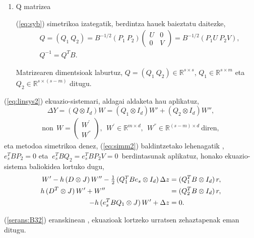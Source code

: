 \begin{enumerate}
\item Q matrizea

(\ref{eq:syb}) simetrikoa izategatik, berdintza hauek baieztatu daitezke,
\begin{align}
&Q=(Q_1 \ Q_2)=
B^{-1/2}(P_1 \ P_2)
\left(
\begin{matrix}
U & 0 \\
0 & V
\end{matrix}
\right)=
B^{-1/2} (P_1U \ P_2V), \\
&Q^{-1}=Q^TB.
\end{align}  

Matrizearen dimentsioak laburtuz, $Q=(Q_1 \ Q_2) \in \mathbb{R}^{s \times s}$, $Q_1 \in \mathbb{R}^{s \times m}$ eta $Q_2 \in \mathbb{R}^{s \times (s-m)}$ ditugu.

\end{enumerate}

(\ref{eq:linsys2}) ekuazio-sistemari, aldagai aldaketa hau aplikatuz,
\begin{equation}
\label{eq:DeltaYChVar}
 \Delta Y = (Q \otimes I_d) W= (Q_1 \otimes I_d) W'+ (Q_2 \otimes I_d) W'',
\end{equation}
\begin{align*}
\text{non}  \ \ W=\left(
\begin{matrix}
W^{'} \\
W^{''} 
\end{matrix}
\right),\ \ W^{'} \in \mathbb{R}^{m \times d}, \ \ W^{''} \in \mathbb{R}^{(s-m) \times d} \ \text{diren},
\end{align*}
%
eta metodoa simetrikoa denez, (\ref{eq:simm2}) baldintzetako lehenagatik , $e_s^TBP_2=0$ eta $\ e_s^TBQ_2=e_s^TBP_2V=0$~berdintasunak aplikatuz, honako ekuazio-sistema baliokidea lortuko dugu,
\begin{equation}
\label{eq:linsys4}
  \begin{split}
       W' -h \, (D \otimes J)\,  W'' - \half\, (Q_1^T B e_s \otimes I_\dim) \, \Delta z &= (Q_1^T B \otimes I_\dim )\, r, \\
    h \, (D^T \otimes J)\, W'  + W'' \phantom{+\half\, (Q_2^T B e_s \otimes I_\dim) \, \Delta z  }
    &= (Q_2^T B \otimes I_\dim )\, r,\\
-h \, (e_s^T  B  Q_1 \otimes J) \, W' + \Delta z &= 0.
  \end{split}
\end{equation}

(\ref{serans:B32}) eranskinean , ekuazioak lortzeko urratsen zehaztapenak eman ditugu.

